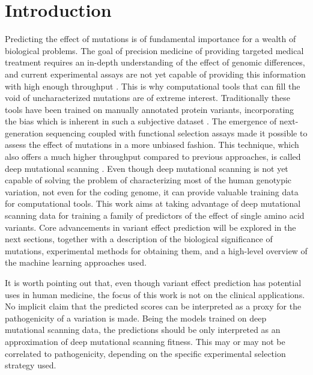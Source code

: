 \thispagestyle{empty}
\cleardoublepage%
\chapter{Introduction}
Predicting the effect of mutations is of fundamental importance for a wealth of biological problems.
The goal of precision medicine of providing targeted medical treatment \parencite{Goetz2018} requires an in-depth understanding of the effect of genomic differences, and current experimental assays are not yet capable of providing this information with high enough throughput \parencite{Reeb2020}.
This is why computational tools that can fill the void of uncharacterized mutations are of extreme interest.
Traditionally these tools have been trained on manually annotated protein variants, incorporating the bias which is inherent in such a subjective dataset \parencite{Gray2018}.
The emergence of next-generation sequencing coupled with functional selection assays made it possible to assess the effect of mutations in a more unbiased fashion.
This technique, which also offers a much higher throughput compared to previous approaches, is called deep mutational scanning \parencite{Fowler2014}.
Even though deep mutational scanning is not yet capable of solving the problem of characterizing most of the human genotypic variation, not even for the coding genome, it can provide valuable training data for computational tools.
This work aims at taking advantage of deep mutational scanning data for training a family of predictors of the effect of single amino acid variants.
Core advancements in variant effect prediction will be explored in the next sections, together with a description of the biological significance of mutations, experimental methods for obtaining them, and a high-level overview of the machine learning approaches used.

It is worth pointing out that, even though variant effect prediction has potential uses in human medicine, the focus of this work is not on the clinical applications.
No implicit claim that the predicted scores can be interpreted as a proxy for the pathogenicity of a variation is made.
Being the models trained on deep mutational scanning data, the predictions should be only interpreted as an approximation of deep mutational scanning fitness.
This may or may not be correlated to pathogenicity, depending on the specific experimental selection strategy used.

